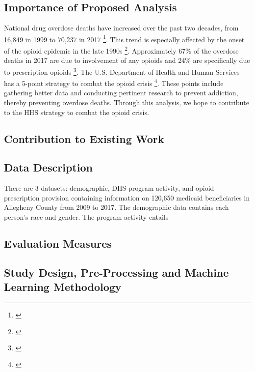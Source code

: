 \documentclass[twoside,11pt]{article}
\begin{document}
\subsection{Importance of Proposed Analysis}
National drug overdose deaths have increased over the past two decades, from 16,849 in 1999 to 70,237 in 2017 \footnote{\cite{NIDA_ODR}}. This trend is especially affected by the onset of the opioid epidemic in the late 1990s \footnote{\cite{NIDA_OOC}}. Approximately 67\% of the overdose deaths in 2017 are due to involvement of any opioids and 24\% are specifically due to prescription opioids \footnote{\cite{NIDA_ODR}}. The U.S. Department of Health and Human Services has a 5-point strategy to combat the opioid crisis \footnote{\cite{HHS}}. These points include gathering better data and conducting pertinent research to prevent addiction, thereby preventing overdose deaths. Through this analysis, we hope to contribute to the HHS strategy to combat the opioid crisis. 

\subsection{Contribution to Existing Work}

\subsection{Data Description}
There are 3 datasets: demographic, DHS program activity, and opioid prescription provision containing information on 120,650 medicaid beneficiaries in Allegheny County from 2009 to 2017. The demographic data contains each person's race and gender. The program activity entails 


\subsection{Evaluation Measures}

\subsection{Study Design, Pre-Processing and Machine Learning Methodology}
\end{document}
